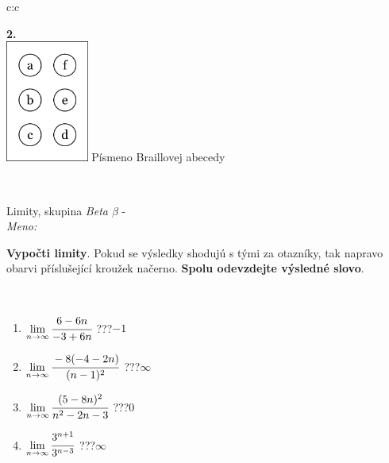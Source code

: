 \documentclass[10pt]{report}
\begin{document}
\begin{tabular}{c:c}
\begin{minipage}[c][104.5mm][t]{0.5\linewidth}
\begin{center}
\begin{minipage}{0.20\linewidth}
\begin{center}
{\Huge\bfseries 2.} \\[2mm]
\includegraphics[height=40mm]{../images/braille.png}
{\small Písmeno Braillovej abecedy}
\end{center}
\end{minipage}
\end{center}
\end{minipage}
\\ \hdashline
\begin{minipage}[c][104.5mm][t]{0.5\linewidth}
\begin{center}
\vspace{7mm}
{\huge Limity, skupina \textit{Beta $\beta$} -}\\[5mm]
\textit{Meno:}\phantom{xxxxxxxxxxxxxxxxxxxxxxxxxxxxxxxxxxxxxxxxxxxxxxxxxxxxxxxxxxxxxxxxx}\\[5mm]
\begin{minipage}{0.95\linewidth}
\begin{center}
\textbf{Vypočti limity}. Pokud se výsledky shodujú s tými za otazníky, tak napravo\\obarvi příslušející kroužek načerno. \textbf{Spolu odevzdejte výsledné slovo}.
\end{center}
\end{minipage}
\\[1mm]
\begin{minipage}{0.79\linewidth}
\begin{center}
\begin{varwidth}{\linewidth}
\begin{enumerate}
\normalsize
\item $\lim\limits_{n\to\infty}\cfrac{6-6n}{-3+6n}$\quad \dotfill\; ???\;\dotfill \quad $-1$
\item $\lim\limits_{n\to\infty}\cfrac{-8(-4-2n)}{(n-1)^2}$\quad \dotfill\; ???\;\dotfill \quad $\infty$
\item $\lim\limits_{n\to\infty}\cfrac{(5-8n)^2}{n^2-2n-3}$\quad \dotfill\; ???\;\dotfill \quad $0$
\item $\lim\limits_{n\to\infty}\cfrac{3^{n+1}}{3^{n-3}}$\quad \dotfill\; ???\;\dotfill \quad $\infty$

\end{enumerate}
\end{varwidth}
\end{center}
\end{minipage}
\end{center}
\end{minipage}
\end{tabular}
\end{document}
